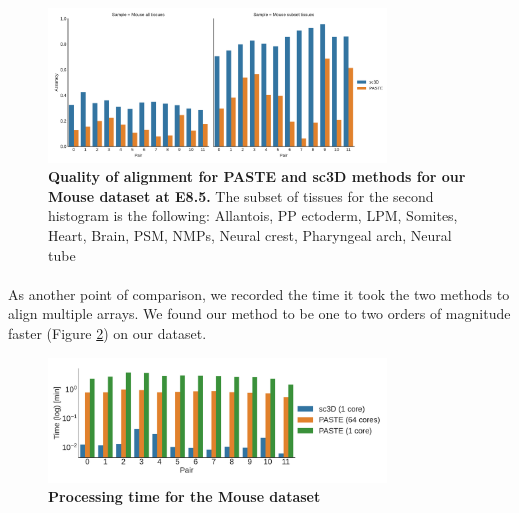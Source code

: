 \documentclass[10pt,a4paper]{article}
\begin{document}
\begin{figure}
\center
\includegraphics[width=0.8\textwidth]{figures/sc3D_vs_PASTE_Mouse}
\caption{\textbf{Quality of alignment for PASTE and sc3D methods for our Mouse dataset at E8.5.} The subset of tissues for the second histogram is the following: Allantois, PP ectoderm, LPM, Somites, Heart, Brain, PSM, NMPs, Neural crest, Pharyngeal arch, Neural tube}\label{fig:qual-Mouse}
\end{figure}
\paragraph{}As another point of comparison, we recorded the time it took the two methods to align multiple arrays. We found our method to be one to two orders of magnitude faster (Figure \ref{fig:time-mouse}) on our dataset.
\begin{figure}
\center
\includegraphics[width=0.8\textwidth]{figures/sc3D_vs_PASTE_time}
\caption{\textbf{Processing time for the Mouse dataset}}\label{fig:time-mouse}
\end{figure}


\end{document}
